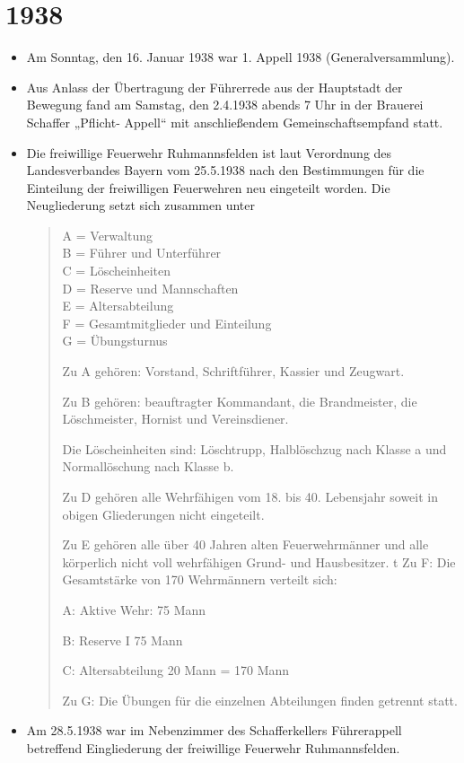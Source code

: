 \documentclass[12pt,a4paper]{book}
\begin{document}
\section*{1938}

\begin{itemize}
\item Am Sonntag, den 16. Januar 1938 war 1. Appell 1938
(Generalversammlung).

\item Aus Anlass der Übertragung der Führerrede aus der Hauptstadt der
Bewegung fand am Samstag, den 2.4.1938 abends 7 Uhr in der Brauerei
Schaffer „Pflicht- Appell“ mit anschließendem Gemeinschaftsempfand
statt.

\item Die freiwillige Feuerwehr Ruhmannsfelden ist laut Verordnung des
Landesverbandes Bayern vom 25.5.1938 nach den Bestimmungen für die
Einteilung der freiwilligen Feuerwehren neu eingeteilt worden. Die
Neugliederung setzt sich zusammen unter

\begin{quote}
A = Verwaltung\\
B = Führer und Unterführer\\
C = Löscheinheiten\\
D = Reserve und Mannschaften\\
E = Altersabteilung\\
F = Gesamtmitglieder und Einteilung\\
G = Übungsturnus

Zu A gehören: Vorstand, Schriftführer, Kassier und Zeugwart.

Zu B gehören: beauftragter Kommandant, die Brandmeister, die
Löschmeister, Hornist und Vereinsdiener.

Die Löscheinheiten sind: Löschtrupp, Halblöschzug nach Klasse a und
Normallöschung nach Klasse b.

Zu D gehören alle Wehrfähigen vom 18. bis 40. Lebensjahr soweit in
obigen Gliederungen nicht eingeteilt.

Zu E gehören alle über 40 Jahren alten Feuerwehrmänner und alle
körperlich nicht voll wehrfähigen Grund- und Hausbesitzer.
t
Zu F: Die Gesamtstärke von 170 Wehrmännern verteilt sich:

A: Aktive Wehr: 75 Mann

B: Reserve I 75 Mann

C: Altersabteilung 20 Mann = 170 Mann

Zu G: Die Übungen für die einzelnen Abteilungen finden getrennt statt.
\end{quote}

\item Am 28.5.1938 war im Nebenzimmer des Schafferkellers Führerappell
betreffend Eingliederung der freiwillige Feuerwehr Ruhmannsfelden.
\end{itemize}
\end{document}
